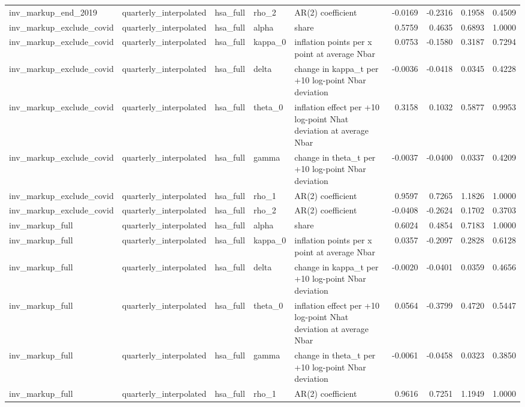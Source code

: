 \begin{tabular}{lllllrrrr}
inv\_markup\_end\_2019 & quarterly\_interpolated & hsa\_full & rho\_2 & AR(2) coefficient & -0.0169 & -0.2316 & 0.1958 & 0.4509 \\
inv\_markup\_exclude\_covid & quarterly\_interpolated & hsa\_full & alpha & share & 0.5759 & 0.4635 & 0.6893 & 1.0000 \\
inv\_markup\_exclude\_covid & quarterly\_interpolated & hsa\_full & kappa\_0 & inflation points per x point at average Nbar & 0.0753 & -0.1580 & 0.3187 & 0.7294 \\
inv\_markup\_exclude\_covid & quarterly\_interpolated & hsa\_full & delta & change in kappa\_t per +10 log-point Nbar deviation & -0.0036 & -0.0418 & 0.0345 & 0.4228 \\
inv\_markup\_exclude\_covid & quarterly\_interpolated & hsa\_full & theta\_0 & inflation effect per +10 log-point Nhat deviation at average Nbar & 0.3158 & 0.1032 & 0.5877 & 0.9953 \\
inv\_markup\_exclude\_covid & quarterly\_interpolated & hsa\_full & gamma & change in theta\_t per +10 log-point Nbar deviation & -0.0037 & -0.0400 & 0.0337 & 0.4209 \\
inv\_markup\_exclude\_covid & quarterly\_interpolated & hsa\_full & rho\_1 & AR(2) coefficient & 0.9597 & 0.7265 & 1.1826 & 1.0000 \\
inv\_markup\_exclude\_covid & quarterly\_interpolated & hsa\_full & rho\_2 & AR(2) coefficient & -0.0408 & -0.2624 & 0.1702 & 0.3703 \\
inv\_markup\_full & quarterly\_interpolated & hsa\_full & alpha & share & 0.6024 & 0.4854 & 0.7183 & 1.0000 \\
inv\_markup\_full & quarterly\_interpolated & hsa\_full & kappa\_0 & inflation points per x point at average Nbar & 0.0357 & -0.2097 & 0.2828 & 0.6128 \\
inv\_markup\_full & quarterly\_interpolated & hsa\_full & delta & change in kappa\_t per +10 log-point Nbar deviation & -0.0020 & -0.0401 & 0.0359 & 0.4656 \\
inv\_markup\_full & quarterly\_interpolated & hsa\_full & theta\_0 & inflation effect per +10 log-point Nhat deviation at average Nbar & 0.0564 & -0.3799 & 0.4720 & 0.5447 \\
inv\_markup\_full & quarterly\_interpolated & hsa\_full & gamma & change in theta\_t per +10 log-point Nbar deviation & -0.0061 & -0.0458 & 0.0323 & 0.3850 \\
inv\_markup\_full & quarterly\_interpolated & hsa\_full & rho\_1 & AR(2) coefficient & 0.9616 & 0.7251 & 1.1949 & 1.0000 \\

\end{tabular}
